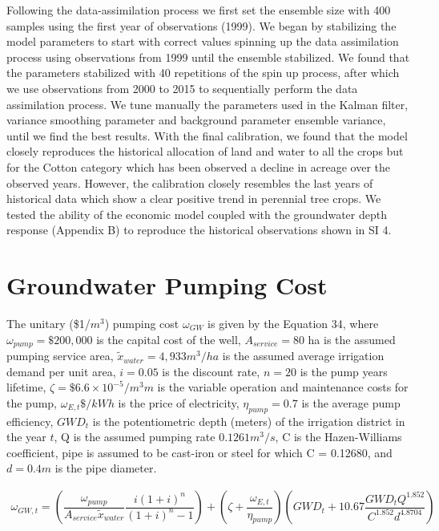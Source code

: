 \documentclass[11pt,a4paper]{article}
\begin{document}
Following the data-assimilation process we first set the ensemble size with 400 samples using the first year of observations (1999). We began by stabilizing the model parameters to start with correct values spinning up the data assimilation process using observations from 1999 until the ensemble stabilized. We found that the parameters stabilized with 40 repetitions of the spin up process, after which we use observations from 2000 to 2015 to sequentially perform the data assimilation process. We tune manually the parameters used in the Kalman filter, variance smoothing parameter and background parameter ensemble variance, until we find the best results. With the final calibration, we found that the model closely reproduces the historical allocation of land and water to all the crops but for the Cotton category which has been observed a decline in acreage over the observed years. However, the calibration closely resembles the last years of historical data which show a clear positive trend in perennial tree crops. We tested the ability of the economic model coupled with the groundwater depth response (Appendix B) to reproduce the historical observations shown in SI 4. 

\section{Groundwater Pumping Cost}

The unitary (\$1/$m^3$) pumping cost $\omega_{GW}$ is given by the Equation 34, where $\omega_{pump}= \$200,000$ is the capital cost of the well, $A_{service}=80$ ha is the assumed pumping service area, $\widetilde{x}_{water}=4,933 m^3/ ha$ is the assumed average irrigation demand per unit area, $i=0.05$ is the discount rate, $n=20$ is the pump years lifetime, $\zeta= \$6.6\times10^{-5} /m^3 m$ is the variable operation and maintenance costs for the pump, $\omega_{E,t} \$/kWh$ is the price of electricity, $\eta_{pump}=0.7$ is the average pump efficiency, $GWD_t$ is the potentiometric depth (meters) of the irrigation district in the year $t$, Q is the assumed pumping rate $0.1261 m^3/s$, C is the Hazen-Williams coefficient, pipe is assumed to be cast-iron or steel for which C = 0.12680, and $d=0.4 m$ is the pipe diameter.

\begin{equation}
\begin{gathered}
\omega_{GW,t} = \left( \dfrac{\omega_{pump}}{A_{service} \widetilde{x}_{water}} \dfrac{i(1+i)^n}{(1+i)^n-1}\right) 
+ \left(\zeta+\dfrac{\omega_{E,t}}{\eta_{pump}} \right) \left(GWD_t +10.67  \dfrac{GWD_t Q^{1.852}}{C^{1.852} d^{4.8704}}\right)
\end{gathered}
\end{equation}            
\end{document}
